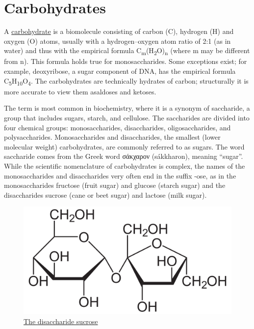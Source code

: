 \hypertarget{carbohydrates}{%
\section{Carbohydrates}\label{carbohydrates}}

A \href{https://en.wikipedia.org/wiki/Carbohydrate}{carbohydrate} is a biomolecule consisting of carbon (C), hydrogen (H) and oxygen (O) atoms, usually with a hydrogen--oxygen atom ratio of 2:1 (as in water) and thus with the empirical formula C\textsubscript{m}(H\textsubscript{2}O)\textsubscript{n} (where m may be different from n). This formula holds true for monosaccharides. Some exceptions exist; for example, deoxyribose, a sugar component of DNA, has the empirical formula C\textsubscript{5}H\textsubscript{10}O\textsubscript{4}. The carbohydrates are technically hydrates of carbon; structurally it is more accurate to view them asaldoses and ketoses.

The term is most common in biochemistry, where it is a synonym of saccharide, a group that includes sugars, starch, and cellulose. The saccharides are divided into four chemical groups: monosaccharides, disaccharides, oligosaccharides, and polysaccharides. Monosaccharides and disaccharides, the smallest (lower molecular weight) carbohydrates, are commonly referred to as sugars. The word saccharide comes from the Greek word σάκχαρον (sákkharon), meaning ``sugar''. While the scientific nomenclature of carbohydrates is complex, the names of the monosaccharides and disaccharides very often end in the suffix -ose, as in the monosaccharides fructose (fruit sugar) and glucose (starch sugar) and the disaccharides sucrose (cane or beet sugar) and lactose (milk sugar).



\begin{figure}

{\centering \includegraphics[width=0.7\linewidth]{./figures/chemistry/Saccharose2} 

}

\caption{\href{https://commons.wikimedia.org/wiki/File:Beta-D-Lactose.svg}{The disaccharide sucrose}}\label{fig:sucrosestruc}
\end{figure}

